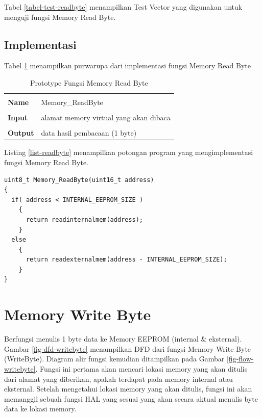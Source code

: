 Tabel \ref{tabel-test-readbyte} menampilkan Test Vector yang digunakan untuk menguji fungsi Memory Read Byte.

\subsection {Implementasi}

Tabel \ref{tabel-readbyte} menampilkan purwarupa dari implementasi fungsi Memory Read Byte

\begin{table}[h]
  \centering
  \begin{tabular}{p{2cm} p{8cm}}
    \hline\\
    {\bf Name} & Memory\_ReadByte\\
    \hline\\
    {\bf Input} & alamat memory virtual yang akan dibaca
    \\
    \hline\\
    {\bf Output} & data hasil pembacaan (1 byte)
    \\
    \hline
  \end{tabular}
  \caption{Prototype Fungsi Memory Read Byte}
  \label{tabel-readbyte}
\end{table}

Listing \ref{list-readbyte} menampilkan potongan program yang mengimplementasi fungsi Memory Read Byte.

\begin{lstlisting}[caption={Listing Program Fungsi Memory Read Byte}, label={list-readbyte}]
uint8_t Memory_ReadByte(uint16_t address)
{
  if( address < INTERNAL_EEPROM_SIZE )
    {
      return readinternalmem(address);
    }
  else
    {
      return readexternalmem(address - INTERNAL_EEPROM_SIZE);
    }
}
\end{lstlisting}

\section{Memory Write Byte}
\label{sec_memorywritebyte}

Berfungsi menulis 1 byte data ke Memory EEPROM (internal & eksternal). Gambar \ref{fig-dfd-writebyte} menampilkan DFD dari fungsi Memory Write Byte (WriteByte). Diagram alir fungsi kemudian ditampilkan pada Gambar \ref{fig-flow-writebyte}. Fungsi ini pertama akan mencari lokasi memory yang akan ditulis dari alamat yang diberikan, apakah terdapat pada memory internal atau eksternal. Setelah mengetahui lokasi memory yang akan ditulis, fungsi ini akan memanggil sebuah fungsi HAL yang sesuai yang akan secara aktual menulis byte data ke lokasi memory.

